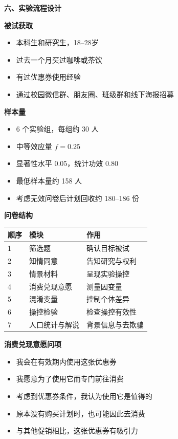 \documentclass[aspectratio=169,UTF8,zihao=-4]{ctexbeamer}
\newcommand{\bigidea}[1]{
  \begin{center}
    \vspace{0.8em}
    {\LARGE \bfseries #1}
    \vspace{0.6em}
  \end{center}
}
\newcommand{\sectionpageframe}[1]{
  \begin{frame}[plain]
    \begin{center}
      \vfill
      {\Huge \bfseries #1}
      \vfill
    \end{center}
  \end{frame}
}
\begin{document}
\sectionpageframe{六、实验流程设计}

\begin{frame}
  \bigidea{被试获取}
  \begin{itemize}
    \item \Large 本科生和研究生，18--28岁
    \item \Large 过去一个月买过咖啡或茶饮
    \item \Large 有过优惠券使用经验
    \item \Large 通过校园微信群、朋友圈、班级群和线下海报招募
  \end{itemize}
\end{frame}

\begin{frame}
  \bigidea{样本量}
  \begin{itemize}
    \item \Large 6 个实验组，每组约 30 人
    \item \Large 中等效应量 $f=0.25$
    \item \Large 显著性水平 0.05，统计功效 0.80
    \item \Large 最低样本量约 158 人
    \item \Large 考虑无效问卷后计划回收约 180--186 份
  \end{itemize}
\end{frame}

\begin{frame}
  \bigidea{问卷结构}
  \centering
  \large
  \setlength{\tabcolsep}{6pt}
  \begin{tabular}{lll}
    \toprule
    顺序 & 模块 & 作用 \\
    \midrule
    1 & 筛选题 & 确认目标被试 \\
    2 & 知情同意 & 告知研究与权利 \\
    3 & 情景材料 & 呈现实验操控 \\
    4 & 消费兑现意愿 & 测量因变量 \\
    5 & 混淆变量 & 控制个体差异 \\
    6 & 操控检验 & 检查操控有效性 \\
    7 & 人口统计与解说 & 背景信息与去欺骗 \\
    \bottomrule
  \end{tabular}
\end{frame}

\begin{frame}
  \bigidea{消费兑现意愿问项}
  \begin{itemize}
    \item \Large 我会在有效期内使用这张优惠券
    \item \Large 我愿意为了使用它而专门前往消费
    \item \Large 考虑到优惠券条件，我认为使用它是值得的
    \item \Large 原本没有购买计划时，也可能因此去消费
    \item \Large 与其他促销相比，这张优惠券有吸引力
  \end{itemize}
\end{frame}
\end{document}
